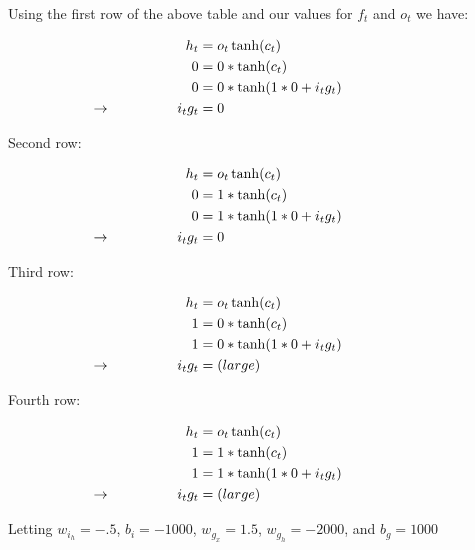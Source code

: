 \documentclass{article}
\begin{document}
Using the first row of the above table and our values for $f_t$ and $o_t$ we have:

\begin{align*}
    h_t &= o_t\tanh(c_t) \\
  0 &= 0*\tanh(c_t) \\
  0&= 0*\tanh(1 * 0 + i_t g_t) \\
  \llap{$\rightarrow$\hspace{50pt}} i_t g_t &= 0
\end{align*}

Second row:

\begin{align*}
    h_t &= o_t\tanh(c_t) \\
  0 &= 1*\tanh(c_t) \\
  0&= 1*\tanh(1 * 0 + i_t g_t) \\
  \llap{$\rightarrow$\hspace{50pt}} i_t g_t &= 0
\end{align*}


Third row:

\begin{align*}
    h_t &= o_t\tanh(c_t) \\
  1 &= 0*\tanh(c_t) \\
  1 &= 0*\tanh(1 * 0 + i_t g_t) \\
  \llap{$\rightarrow$\hspace{50pt}} i_t g_t &= (large)
\end{align*}

Fourth row:

\begin{align*}
    h_t &= o_t\tanh(c_t) \\
  1 &= 1*\tanh(c_t) \\
  1 &= 1*\tanh(1 * 0 + i_t g_t) \\
  \llap{$\rightarrow$\hspace{50pt}} i_t g_t &= (large)
\end{align*}

Letting $w_{i_h}=-.5$, $b_i=-1000$, $w_{g_x}=1.5$, $w_{g_h}=-2000$, and $b_g=1000$
\end{document}

